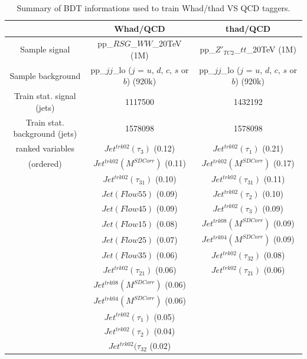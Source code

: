 \begin{table}[!htb]\centering
\begin{tabular}{|c|c|c|}
\hline
\hline			
 & Whad/QCD & thad/QCD \\
\hline                        
Sample signal     & pp\_$RSG$\_$WW$\_20TeV (1M) & pp\_$Z'_{TC2}$\_$tt$\_20TeV (1M) \\
Sample background & pp\_$jj$\_lo ($j$ = $u$, $d$, $c$, $s$ or $b$) (920k) & pp\_$jj$\_lo ($j$ = $u$, $d$, $c$, $s$ or $b$) (920k)               \\
\hline
Train stat. signal (jets)     & 1117500 & 1432192 \\
Train stat. background (jets) & 1578098 & 1578098 \\
\hline
ranked variables & $Jet^{trk02}(\tau_3)$ (0.12)      & $Jet^{trk02}(\tau_1)$ (0.21) \\
(ordered)        & $Jet^{trk02}(M^{SD Corr})$ (0.11) & $Jet^{trk02}(M^{SD Corr})$ (0.17) \\
                 & $Jet^{trk02}(\tau_{31})$ (0.10)   & $Jet^{trk02}(\tau_{31})$ (0.11) \\
                 & $Jet(Flow55)$ (0.09)              & $Jet^{trk02}(\tau_2)$ (0.10) \\
                 & $Jet(Flow45)$ (0.09)              & $Jet^{trk02}(\tau_3)$ (0.09) \\
                 & $Jet(Flow15)$ (0.08)              & $Jet^{trk08}(M^{SD Corr})$ (0.09) \\
                 & $Jet(Flow25)$ (0.07)              & $Jet^{trk04}(M^{SD Corr})$ (0.09) \\
                 & $Jet(Flow35)$ (0.06)              & $Jet^{trk02}(\tau_{32})$ (0.08) \\
                 & $Jet^{trk02}(\tau_{21})$ (0.06)   & $Jet^{trk02}(\tau_{21})$ (0.06) \\
                 & $Jet^{trk08}(M^{SD Corr})$ (0.06) &  \\
                 & $Jet^{trk04}(M^{SD Corr})$ (0.06) &  \\
                 & $Jet^{trk02}(\tau_1)$ (0.05)      &  \\
                 & $Jet^{trk02}(\tau_2)$ (0.04)      &  \\
                 & $Jet^{trk02}(\tau_{32}$ (0.02)    &  \\
\hline
\hline
\end{tabular}
\caption{Summary of BDT informations used to train Whad/thad VS QCD taggers.}
\label{tab:TMVA_summary}
\end{table}

